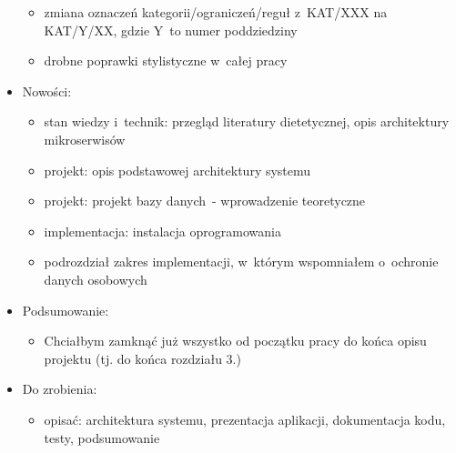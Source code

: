\begin{itemize}
\begin{itemize}
	\item zmiana oznaczeń kategorii/ograniczeń/reguł z~KAT/XXX na KAT/Y/XX, gdzie Y~to numer poddziedziny
	\item drobne poprawki stylistyczne w~całej pracy
	\end{itemize}
\item Nowości:
    \begin{itemize}
	\item stan wiedzy i~technik: przegląd literatury dietetycznej, opis architektury mikroserwisów
	\item projekt: opis podstawowej architektury systemu
	\item projekt: projekt bazy danych~- wprowadzenie teoretyczne
	\item implementacja: instalacja oprogramowania
	\item podrozdział zakres implementacji, w~którym wspomniałem o~ochronie danych osobowych
	\end{itemize}
\item Podsumowanie:
    \begin{itemize}
	\item Chciałbym zamknąć już wszystko od początku pracy do końca opisu projektu (tj. do końca rozdziału 3.)
	\end{itemize}
\item Do zrobienia:
    \begin{itemize}
	\item opisać: architektura systemu, prezentacja aplikacji, dokumentacja kodu, testy, podsumowanie
	\end{itemize}
\end{itemize}

\cleardoublepage
{}
